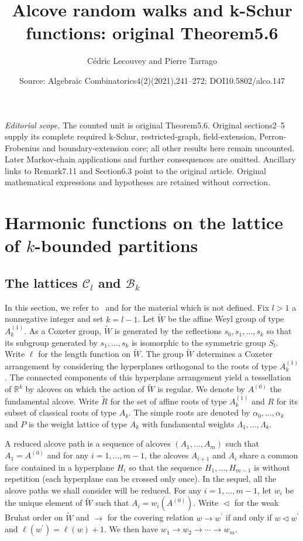 \documentclass[10pt,a4paper]{amsart}
\title[Nonnegative k-Schur morphisms]{Alcove random walks and k-Schur functions: original Theorem5.6}
\author{Cédric Lecouvey and Pierre Tarrago}
\date{Source: Algebraic Combinatorics4(2)(2021),241--272; DOI10.5802/alco.147}
\theoremstyle{definition}
\begin{document}
\maketitle
\noindent\textit{Editorial scope.} The counted unit is original Theorem5.6. Original sections2--5 supply its complete required k-Schur, restricted-graph, field-extension, Perron-Frobenius and boundary-extension core; all other results here remain uncounted. Later Markov-chain applications and further consequences are omitted. Ancillary links to Remark7.11 and Section6.3 point to the original article. Original mathematical expressions and hypotheses are retained without correction.
\setcounter{section}{1}
\section{Harmonic functions on the lattice of \texorpdfstring{$k$}{k}-bounded partitions}\label{section2}

\subsection{The lattices \texorpdfstring{$\mathcal{C}_{l}$}{Cl} and \texorpdfstring{$\mathcal{B}_{k}$}{BK}}
\label{subset_Lattices}

In this section, we refer to~\cite{LLMSSZ} and
\cite{Mac} for the material which is not defined. Fix $l>1$ a nonnegative
integer and set $k=l-1$. Let $\widetilde{W}$ be the affine Weyl group of type
$A_{k}^{(1)}$. As a Coxeter group, $\widetilde{W}$ is generated by the
reflections $s_{0},s_{1},\ldots,s_{k}$ so that its subgroup generated by
$s_{1},\ldots,s_{k}$ is isomorphic to the symmetric group $S_{l}$. Write
$\ell$ for the length function on $\widetilde{W}$. The group $\widetilde{W}$
determines a Coxeter arrangement by considering the hyperplanes orthogonal to
the roots of type $A_{k}^{(1)}$. The connected components of this hyperplane
arrangement yield a tessellation of $\mathbb{R}^{k}$ by alcoves on which the
action of $\widetilde{W}$ is regular. We denote by $A^{(0)}$ the fundamental
alcove. Write $\widetilde{R}$ for the set of affine roots of type $A_{k}%
^{(1)}$ and $R$ for its subset of classical roots of type $A_{k}$. The simple
roots are denoted by $\alpha_{0},\ldots,\alpha_{k}$ and $P$ is the weight
lattice of type $A_{k}$ with fundamental weights $\Lambda_{1},\ldots
,\Lambda_{k}$.

A reduced alcove path is a sequence of alcoves $(A_{1},\ldots,A_{m})$ such
that $A_{1}=A^{(0)}$ and for any $i=1,\ldots,m-1$, the alcoves $A_{i+1}$ and
$A_{i}$ share a common face contained in a hyperplane $H_{i}$ so that the
sequence $H_{1},\ldots,H_{m-1}$ is without repetition (each hyperplane can be
crossed only once). In the sequel, all the alcove paths we shall consider
will be reduced. For any $i=1,\ldots,m-1$, let $w_{i}$ be the unique element
of $\widetilde{W}$ such that $A_{i}=w_{i}(A^{(0)})$. Write $\vartriangleleft$
for the weak Bruhat order on $\widetilde{W}$ and $\rightarrow$ for the
covering relation $w\rightarrow w^{\prime}$ if and only if $w\vartriangleleft
w^{\prime}$ and $\ell(w^{\prime})=\ell(w)+1$. We then have $w_{1}\rightarrow
w_{2}\rightarrow\cdots\rightarrow w_{m}$.
\end{document}
